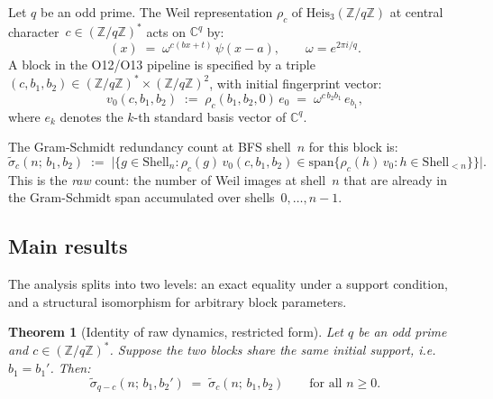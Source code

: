 \documentclass[11pt,a4paper]{article}
\newtheorem{theorem}{Theorem}[section]
\theoremstyle{definition}
\newcommand{\Heis}{\mathrm{Heis}_3}
\newcommand{\ZqZ}{\mathbb{Z}/q\mathbb{Z}}
\newcommand{\Fq}{(\mathbb{Z}/q\mathbb{Z})^*}
\begin{document}
      Let $q$ be an odd prime.
      The Weil representation $\rho_c$ of $\Heis(\ZqZ)$ at central
      character~$c \in \Fq$ acts on $\mathbb{C}^q$ by:
      \begin{equation}
        [\rho_c(a,b,t)\,\psi](x) \;=\; \omega^{c(bx + t)}\,\psi(x-a),
        \qquad \omega = e^{2\pi i/q}.
        \label{eq:weil_def}
      \end{equation}
      A block in the O12/O13 pipeline is specified by a triple
      $(c, b_1, b_2) \in \Fq \times (\ZqZ)^2$, with initial fingerprint
      vector:
      \begin{equation}
        v_0(c, b_1, b_2) \;:=\; \rho_c(b_1, b_2, 0)\,e_0
        \;=\; \omega^{c\,b_2 b_1}\,e_{b_1},
        \label{eq:v0}
      \end{equation}
      where $e_k$ denotes the $k$-th standard basis vector of $\mathbb{C}^q$.

      The Gram-Schmidt redundancy count at BFS shell~$n$ for this block is:
      \begin{equation}
        \tilde\sigma_c(n;\, b_1, b_2)
        \;:=\; \bigl|\bigl\{g \in \mathrm{Shell}_n :
        \rho_c(g)\,v_0(c,b_1,b_2)
        \in \mathrm{span}\bigl\{\rho_c(h)\,v_0 : h \in \mathrm{Shell}_{<n}\bigr\}\bigr\}\bigr|.
        \label{eq:raw_sigma}
      \end{equation}
      This is the \emph{raw} count: the number of Weil images at shell~$n$
      that are already in the Gram-Schmidt span accumulated over
      shells~$0, \ldots, n-1$.

    \subsection{Main results}

      The analysis splits into two levels: an exact equality under a support
      condition, and a structural isomorphism for arbitrary block parameters.

      \begin{theorem}[Identity of raw dynamics, restricted form]
        \label{thm:identity}
        Let $q$ be an odd prime and $c \in \Fq$.
        Suppose the two blocks share the same initial support, i.e.\ $b_1 = b_1'$.
        Then:
        \begin{equation}
          \tilde\sigma_{q-c}(n;\, b_1, b_2')
          \;=\; \tilde\sigma_c(n;\, b_1, b_2)
          \qquad \text{for all } n \geq 0.
          \label{eq:raw_identity}
        \end{equation}
      \end{theorem}
\end{document}
